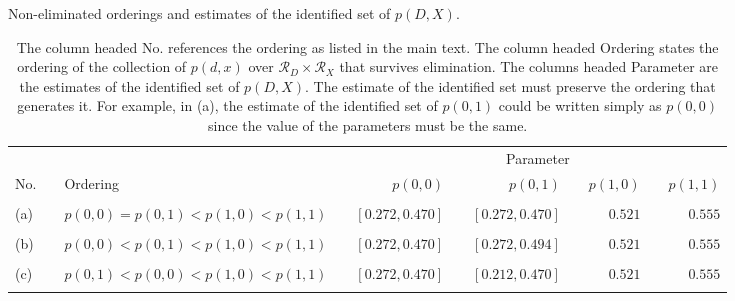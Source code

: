 \documentclass[12pt,a4paper,twoside]{article}
\renewcommand{\baselinestretch}{1.5}
\numberwithin{equation}{section}
\begin{document}
\clearpage
\renewcommand{\baselinestretch}{1}
\begin{sidewaystable}[p]
\centering
\caption{Non-eliminated orderings and estimates of the identified set of $p(D,X)$.}
\begin{tabular}{lclcrcrcrcr}
\toprule
&	& &	& \multicolumn{7}{c}{Parameter} \\
\cmidrule(r){4-11}	
No. & &	Ordering &	&	$p(0,0)$	&	&	$p(0,1)$	&	&	$p(1,0)$	&	&	$p(1,1)$\\
\midrule
\\
(a)& & $p(0,0)=p(0,1)<p(1,0)<p(1,1)$	&	&	$[0.272,0.470]$	&	&	$[0.272,0.470]$	&	&	$0.521$	&	&	$0.555$\\
\\
(b) & &$p(0,0)<p(0,1)<p(1,0)<p(1,1)$	&	&	$[0.272,0.470]$	&	&	$[0.272,0.494]$	&	&	$0.521$	&	&	$0.555$\\
\\
(c) & &$p(0,1)<p(0,0)<p(1,0)<p(1,1)$	&	&	$[0.272,0.470]$	&	&	$[0.212,0.470]$	&	&	$0.521$	&	&	$0.555$\\
\\
\bottomrule
\end{tabular}
\vspace{10pt}
\renewcommand{\baselinestretch}{1.5}
\caption*{\scriptsize The column headed No. references the ordering as listed in the main text. The column headed Ordering states the ordering of the collection of $p(d,x)$ over $\mathcal{R}_D\times\mathcal{R}_X$ that survives elimination. The columns headed Parameter are the estimates of the identified set of $p(D,X)$. The estimate of the identified set must preserve the ordering that generates it. For example, in (a), the estimate of the identified set of $p(0,1)$ could be written simply as $p(0,0)$ since the value of the parameters must be the same.}
\label{tbl:hispm}
\end{sidewaystable}
\clearpage
\renewcommand{\baselinestretch}{1}
\end{document}
